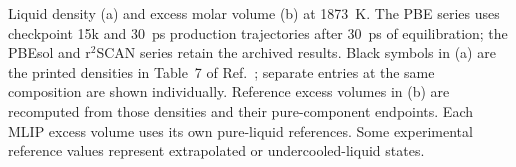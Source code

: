 \caption{Liquid density (a) and excess molar volume (b) at 1873~K. The PBE series uses checkpoint 15k and 30~ps production trajectories after 30~ps of equilibration; the PBEsol and r$^2$SCAN series retain the archived results. Black symbols in (a) are the printed densities in Table~7 of Ref.~; separate entries at the same composition are shown individually. Reference excess volumes in (b) are recomputed from those densities and their pure-component endpoints. Each MLIP excess volume uses its own pure-liquid references. Some experimental reference values represent extrapolated or undercooled-liquid states.}

